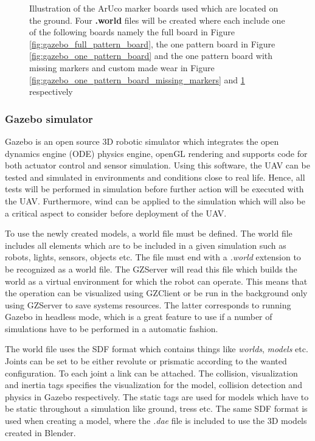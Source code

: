 \documentclass[../Head/report.tex]{subfiles}
\begin{document}
\begin{figure}[H]
\begin{subfigure}[t]{.20\textwidth}
        \caption{}
        \label{fig:gazebo_one_pattern_board_missing_markers_wear}
    \end{subfigure}
    \caption{Illustration of the ArUco marker boards used which are located on the ground. Four \textbf{.world} files will be created where each include one of the following boards namely the full board in Figure \ref{fig:gazebo_full_pattern_board}, the one pattern board in Figure \ref{fig:gazebo_one_pattern_board} and the one pattern board with missing markers and custom made wear in Figure \ref{fig:gazebo_one_pattern_board_missing_markers} and \ref{fig:gazebo_one_pattern_board_missing_markers_wear} respectively}  
    \label{fig:gazebo_full_and_one_patterns_boards}
\end{figure}

\subsubsection{Gazebo simulator}
\label{sec:gazebo}

Gazebo is an open source 3D robotic simulator which integrates the open dynamics engine (ODE) physics engine, openGL rendering and supports code for both actuator control and sensor simulation. Using this software, the UAV can be tested and simulated in environments and conditions close to real life. Hence, all tests will be performed in simulation before further action will be executed with the UAV. Furthermore, wind can be applied to the simulation which will also be a critical aspect to consider before deployment of the UAV. 

To use the newly created models, a world file must be defined. The world file includes all elements which are to be included in a given simulation such as robots, lights, sensors, objects etc. The file must end with a \textit{.world} extension to be recognized as a world file. The GZServer will read this file which builds the world as a virtual environment for which the robot can operate. This means that the operation can be visualized using GZClient or be run in the background only using GZServer to save systems resources. The latter corresponds to running Gazebo in headless mode, which is a great feature to use if a number of simulations have to be performed in a automatic fashion.

The world file uses the SDF format which contains things like \textit{worlds}, \textit{models} etc. Joints can be set to be either revolute or prismatic according to the wanted configuration. To each joint a link can be attached. The collision, visualization and inertia tags specifies the visualization for the model, collision detection and physics in Gazebo respectively. The static tags are used for models which have to be static throughout a simulation like ground, tress etc. The same SDF format is used when creating a model, where the \textit{.dae} file is included to use the 3D models created in Blender.  
\end{document}
